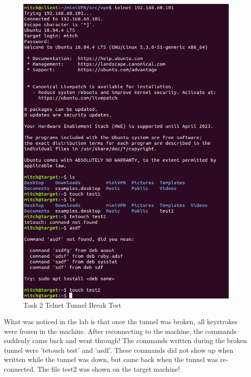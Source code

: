 \documentclass[12pt]{article}
\newcommand\tab[1][0.5cm]{\hspace*{#1}}
\begin{document}
    \begin{figure}[H]
        \begin{center}
            \includegraphics[scale=0.5]{t2_telnet_tunnel_break.png}
        \end{center}{}
        \caption{Task 2 Telnet Tunnel Break Test}
        \label{fig:t2_telnet_tunnel_break}
    \end{figure}

    \tab What was noticed in the lab is that once the tunnel was broken, all keystrokes were frozen in the machine. After reconnecting to the machine, the commands suddenly came back and went through! The commands written during the broken tunnel were 'tetouch test' and 'asdf'. These commands did not show up when written while the tunnel was down, but came back when the tunnel was re-connected. The file test2 was shown on the target machine!
\end{document}
